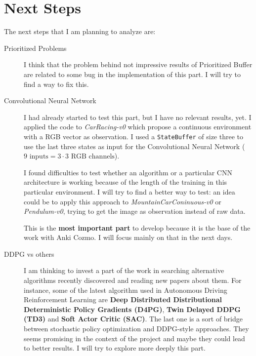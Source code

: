 \documentclass[a4paper, 11pt]{article}
\begin{document}
	\section{Next Steps} \label{next}
	The next steps that I am planning to analyze are:
	\begin{description}
		\item[Prioritized Problems] I think that the problem behind not impressive results of Prioritized Buffer are related to some bug in the implementation of this part. I will try to find a way to fix this.
		\item[Convolutional Neural Network] I had already started to test this part, but I have no relevant results, yet. I applied  the code to \textit{CarRacing-v0} which propose a continuous environment with a RGB vector as observation. I used a \texttt{StateBuffer} of size three to use the last three states as input for the Convolutional Neural Network ($9 \text{ inputs} = 3 \cdot 3 \text{ RGB channels}$).
		
		I found difficulties to test whether an algorithm or a particular CNN architecture is working because of the length of the training in this particular environment. I will try to find a better way to test: an idea could be to apply this approach to \textit{MountainCarConinuous-v0} or \textit{Pendulum-v0}, trying to get the image as observation instead of raw data.
		
		This is the \textbf{most important part} to develop because it is the base of the work with Anki Cozmo. I will focus mainly on that in the next days.
		
		\item[DDPG vs others] I am thinking to invest a part of the work in searching alternative algorithms recently discovered and reading new papers about them. For instance, some of the latest algorithm used in Autonomous Driving Reinforcement Learning are \textbf{Deep Distributed Distributional Deterministic Policy Gradients (D4PG)}, \textbf{Twin Delayed DDPG (TD3)} and \textbf{Soft Actor Critic (SAC)}. The last one is a sort of bridge between stochastic policy optimization and DDPG-style approaches. They seems promising in the context of the project and maybe they could lead to better results.
		I will try to explore more deeply this part.
		
	\end{description}	
	\newpage
	
	
	
	
\end{document}
